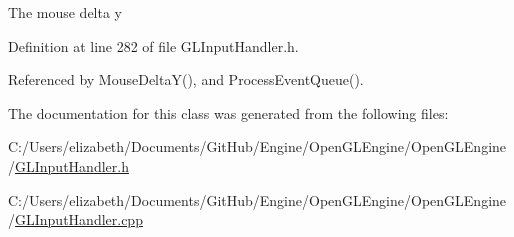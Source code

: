 The mouse delta y 



Definition at line 282 of file G\+L\+Input\+Handler.\+h.



Referenced by Mouse\+Delta\+Y(), and Process\+Event\+Queue().



The documentation for this class was generated from the following files\+:\begin{DoxyCompactItemize}
\item 
C\+:/\+Users/elizabeth/\+Documents/\+Git\+Hub/\+Engine/\+Open\+G\+L\+Engine/\+Open\+G\+L\+Engine/\hyperlink{_g_l_input_handler_8h}{G\+L\+Input\+Handler.\+h}\item 
C\+:/\+Users/elizabeth/\+Documents/\+Git\+Hub/\+Engine/\+Open\+G\+L\+Engine/\+Open\+G\+L\+Engine/\hyperlink{_g_l_input_handler_8cpp}{G\+L\+Input\+Handler.\+cpp}\end{DoxyCompactItemize}
